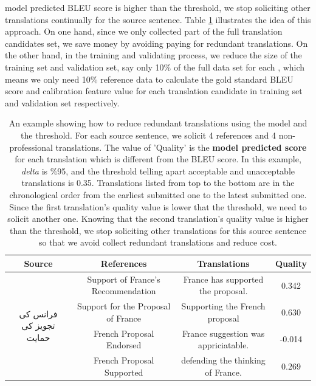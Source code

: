 \documentclass[11pt]{article}
\begin{document}
 model predicted BLEU score is higher than the threshold, we stop soliciting other translations continually for the source sentence. Table \ref{texample} illustrates the idea of this approach. On one hand, since we only collected part of the full translation candidates set, we save money by avoiding paying for  redundant   translations.  On the other hand, in the training and validating process, we reduce the size of the training set and validation set, say only 10\% of the full data set for each , which means we only need 10\% reference data to calculate the gold standard BLEU score and calibration feature value for each translation candidate in training set and validation set respectively. 
 
 \begin{table}[t]
 \center
\begin{tabular}{|c|c|c|c|}
\hline
Source                                   & References                         & Translations                         & Quality \\ \hline
\multirow{4}{*}{فرانس کی تجویز کی حمایت} & Support of France's Recommendation & France has supported the proposal.   & 0.342   \\ \cline{2-4} 
                                         & Support for the Proposal of France & Supporting the French proposal       & 0.630   \\ \cline{2-4} 
                                         & French Proposal Endorsed           & France suggestion was appriciatable. & -0.014  \\ \cline{2-4} 
                                         & French Proposal Supported          & defending the thinking of France.    & 0.269   \\ \hline
\end{tabular}
\caption{An example showing how to reduce redundant translations using the  model and the threshold. For each source sentence, we solicit 4 references and 4 non-professional translations. The value of 'Quality' is the \textbf{ model predicted score} for each translation which is different from the BLEU score. In this example, \textit{delta} is \%95, and the threshold telling apart acceptable and unacceptable translations is 0.35. Translations listed from top to the bottom are in the chronological order from the earliest submitted one to the latest submitted one. Since the first translation's quality value is lower that the threshold, we need to solicit another one.  Knowing that the second translation's quality value is higher than the threshold,  we stop soliciting other translations for this source sentence so that we avoid collect redundant translations and reduce cost.}
\label{texample}
\end{table}
 
\end{document}
